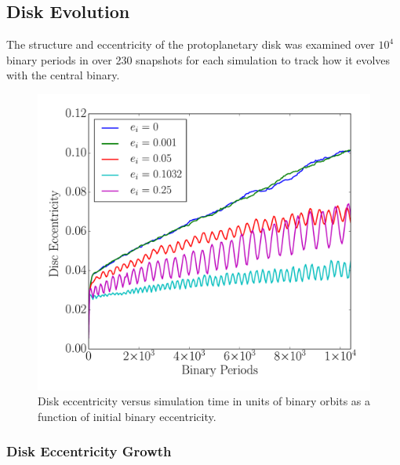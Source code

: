 
\subsection{Disk Evolution}

The structure and eccentricity of the protoplanetary disk was examined over $10^4$ binary periods in over 230 snapshots
for each simulation to track how it evolves with the central binary.

\begin{figure}
	\includegraphics[width=\columnwidth]{f2}
    \caption{Disk eccentricity versus simulation time in units of binary orbits as a function of initial binary eccentricity.}
    \label{fig:CBDiskDiskEcc}
\end{figure}


\subsubsection{Disk Eccentricity Growth} \label{CBDisk:sec:discEccEvolution}

